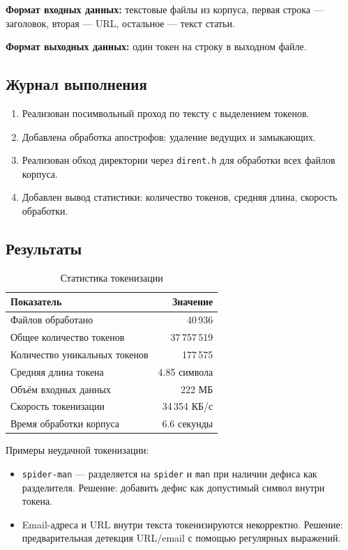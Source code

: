 \documentclass[a4paper,12pt]{article}
\begin{document}
\textbf{Формат входных данных:} текстовые файлы из корпуса, первая строка --- заголовок, вторая --- URL, остальное --- текст статьи.

\textbf{Формат выходных данных:} один токен на строку в выходном файле.

\subsection{Журнал выполнения}

\begin{enumerate}
    \item Реализован посимвольный проход по тексту с выделением токенов.
    \item Добавлена обработка апострофов: удаление ведущих и замыкающих.
    \item Реализован обход директории через \texttt{dirent.h} для обработки всех файлов корпуса.
    \item Добавлен вывод статистики: количество токенов, средняя длина, скорость обработки.
\end{enumerate}

\subsection{Результаты}

\begin{table}[H]
    \centering
    \caption{Статистика токенизации}
    \begin{tabular}{lr}
        \toprule
        \textbf{Показатель} & \textbf{Значение} \\
        \midrule
        Файлов обработано & 40\,936 \\
        Общее количество токенов & 37\,757\,519 \\
        Количество уникальных токенов & 177\,575 \\
        Средняя длина токена & 4.85 символа \\
        Объём входных данных & 222 МБ \\
        Скорость токенизации & 34\,354 КБ/с \\
        Время обработки корпуса & 6.6 секунды \\
        \bottomrule
    \end{tabular}
\end{table}

Примеры неудачной токенизации:
\begin{itemize}
    \item \texttt{spider-man} --- разделяется на \texttt{spider} и \texttt{man} при наличии дефиса как разделителя. Решение: добавить дефис как допустимый символ внутри токена.
    \item Email-адреса и URL внутри текста токенизируются некорректно. Решение: предварительная детекция URL/email с помощью регулярных выражений.
\end{itemize}
\end{document}
